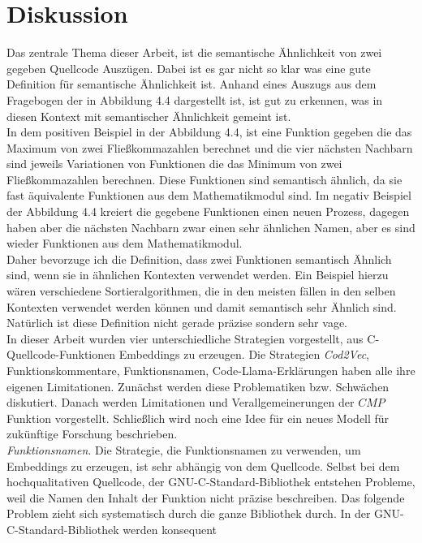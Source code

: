 \documentclass[12pt,letterpaper,ngerman]{article}
\begin{document}
\section{Diskussion}
Das zentrale Thema dieser Arbeit, ist die semantische Ähnlichkeit
von zwei gegeben Quellcode Auszügen. Dabei ist es gar nicht so klar 
was eine gute Definition für semantische Ähnlichkeit ist.
Anhand eines Auszugs aus dem Fragebogen der in Abbildung 4.4
dargestellt ist, ist gut zu erkennen,
was in diesen Kontext mit semantischer Ähnlichkeit gemeint ist.\\
In dem positiven Beispiel in der Abbildung 4.4, ist eine Funktion
gegeben die das Maximum von zwei Fließkommazahlen berechnet und die
vier
nächsten Nachbarn sind jeweils Variationen von Funktionen die das
Minimum von zwei Fließkommazahlen berechnen. Diese Funktionen sind
semantisch ähnlich, da sie fast äquivalente Funktionen aus dem
Mathematikmodul sind. Im negativ Beispiel der Abbildung 4.4 kreiert
die gegebene Funktionen einen neuen Prozess, dagegen haben aber die 
nächsten Nachbarn zwar einen sehr ähnlichen Namen, aber es sind 
wieder Funktionen aus dem Mathematikmodul.\\
Daher bevorzuge ich die Definition, dass zwei Funktionen semantisch
Ähnlich sind, wenn sie in ähnlichen Kontexten verwendet werden. 
Ein Beispiel hierzu wären verschiedene Sortieralgorithmen, die in 
den meisten fällen in den selben Kontexten verwendet werden können 
und damit semantisch sehr Ähnlich sind. Natürlich ist diese 
Definition nicht gerade präzise sondern sehr vage.\\
In dieser Arbeit wurden vier unterschiedliche Strategien
vorgestellt, aus C-Quellcode-Funktionen Embeddings zu erzeugen.
Die Strategien \textit{Cod2Vec}, Funktionskommentare, 
Funktionsnamen, Code-Llama-Erklärungen haben alle ihre 
eigenen Limitationen. Zunächst werden diese Problematiken
bzw. Schwächen diskutiert. Danach werden Limitationen 
und Verallgemeinerungen der $CMP$ Funktion vorgestellt.
Schließlich wird noch eine Idee für ein neues Modell 
für zukünftige Forschung beschrieben.
\pagebreak\\
\textit{Funktionsnamen}. Die Strategie, die Funktionsnamen zu 
verwenden, um Embeddings zu erzeugen, ist sehr abhängig von 
dem Quellcode. Selbst bei dem hochqualitativen Quellcode, 
der GNU-C-Standard-Bibliothek entstehen Probleme, weil die 
Namen den Inhalt der Funktion nicht präzise beschreiben.
Das folgende Problem zieht sich systematisch durch die 
ganze Bibliothek durch. In der GNU-C-Standard-Bibliothek
werden konsequent 
\end{document}
